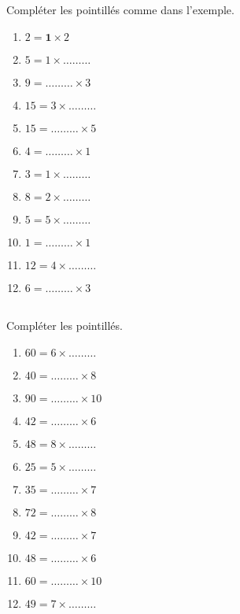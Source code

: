 





\phantom{0}\\
\exercice \diff[1] \\
Compléter les pointillés comme dans l'exemple.
\begin{multicols}{4}
\begin{enumerate}
\item $2 = \textbf{1} \times 2$
\item $5 = 1 \times \ldots\ldots\ldots$
\item $9 = \ldots\ldots\ldots \times 3$
\item $15 = 3 \times \ldots\ldots\ldots$
\item $15 = \ldots\ldots\ldots \times 5$
\item $4 = \ldots\ldots\ldots \times 1$
\item $3 = 1 \times \ldots\ldots\ldots$
\item $8 = 2 \times \ldots\ldots\ldots$
\item $5 = 5 \times \ldots\ldots\ldots$
\item $1 = \ldots\ldots\ldots \times 1$
\item $12 = 4 \times \ldots\ldots\ldots$
\item $6 = \ldots\ldots\ldots \times 3$
\end{enumerate}
\end{multicols}

\exercice \diff[2] \\
Compléter les pointillés.
\begin{multicols}{4}
\begin{enumerate}
\item $60 = 6 \times \ldots\ldots\ldots$
\item $40 = \ldots\ldots\ldots \times 8$
\item $90 = \ldots\ldots\ldots \times 10$
\item $42 = \ldots\ldots\ldots \times 6$
\item $48 = 8 \times \ldots\ldots\ldots$
\item $25 = 5 \times \ldots\ldots\ldots$
\item $35 = \ldots\ldots\ldots \times 7$
\item $72 = \ldots\ldots\ldots \times 8$
\item $42 = \ldots\ldots\ldots \times 7$
\item $48 = \ldots\ldots\ldots \times 6$
\item $60 = \ldots\ldots\ldots \times 10$
\item $49 = 7 \times \ldots\ldots\ldots$
\end{enumerate}
\end{multicols}

